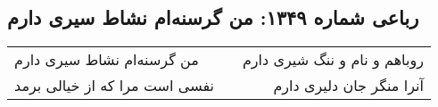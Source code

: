 \begin{center}
\section*{رباعی شماره ۱۳۴۹: من گرسنه‌ام نشاط سیری دارم}
\label{sec:1349}
\begin{longtable}{l p{0.5cm} r}
من گرسنه‌ام نشاط سیری دارم
&&
روباهم و نام و ننگ شیری دارم
\\
نفسی است مرا که از خیالی برمد
&&
آنرا منگر جان دلیری دارم
\\
\end{longtable}
\end{center}
